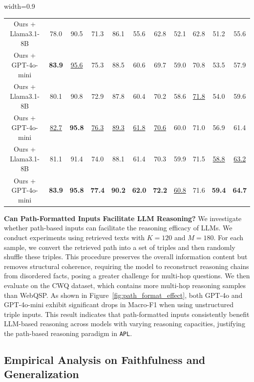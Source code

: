 \documentclass{article}
\theoremstyle{plain}
\theoremstyle{definition}
\theoremstyle{remark}
\newcommand{\tb}[1]{\textbf{#1}}
\newcommand{\proj}{\texttt{\scalebox{1.03}{R}APL}}
\begin{document}
\begin{table}[!t]
\begin{adjustbox}{width=0.9\textwidth}
\begin{tabular}{ccccccccccc}
            \midrule
            Ours + Llama3.1-8B
            & 78.0 & 90.5 & 71.3 & 86.1 & 55.6 & 62.8 & 52.1 & 62.8 & 51.2 & 55.6 \\
            Ours + GPT-4o-mini
            & \tb{83.9} & \underline{95.6} & 75.3 & 88.5 & 60.6 & 69.7 & 59.0 & 70.8 & 53.5 & 57.9 \\
            \midrule
            Ours + Llama3.1-8B
            & 80.1 & 90.8 & 72.9 & 87.8 & 60.4 & 70.2 & 58.6 & \underline{71.8} & 54.0 & 59.6 \\
            Ours + GPT-4o-mini
            & \underline{82.7} & \tb{95.8} & \underline{76.3} & \underline{89.3} & \underline{61.8} & \underline{70.6} & 60.0 & 71.0 & 56.9 & 61.4 \\
            \midrule
            Ours + Llama3.1-8B
            & 81.1 & 91.4 & 74.0 & 88.1 & 61.4 & 70.3 & 59.9 & 71.5 & \underline{58.8} & \underline{63.2} \\
            Ours + GPT-4o-mini
            & \tb{83.9} & \tb{95.8} & \tb{77.4} & \tb{90.2} & \tb{62.0} & \tb{72.2} & \underline{60.8} & 71.6 & \tb{59.4} & \tb{64.7} \\
            \bottomrule
        \end{tabular}
    \end{adjustbox}
    \vspace{-10pt}
\end{table}

\tb{Can Path-Formatted Inputs Facilitate LLM Reasoning?}
We investigate whether path-based inputs can facilitate the reasoning efficacy of LLMs. We conduct experiments using retrieved texts with $K=120$ and $M=180$. For each sample, we convert the retrieved path into a set of triples and then randomly shuffle these triples. This procedure preserves the overall information content but removes structural coherence, requiring the model to reconstruct reasoning chains from 
disordered facts, posing a greater challenge for multi-hop questions. We then evaluate on the CWQ dataset, which contains more multi-hop reasoning samples than WebQSP. As shown in Figure~\ref{fig:path_format_effect}, both GPT-4o and GPT-4o-mini exhibit significant drops in Macro-F1 when using unstructured triple inputs. This result indicates that path-formatted inputs consistently benefit LLM-based reasoning across models with varying reasoning capacities, justifying the path-based reasoning paradigm in \proj.
\subsection{Empirical Analysis on Faithfulness and Generalization}
\end{document}
